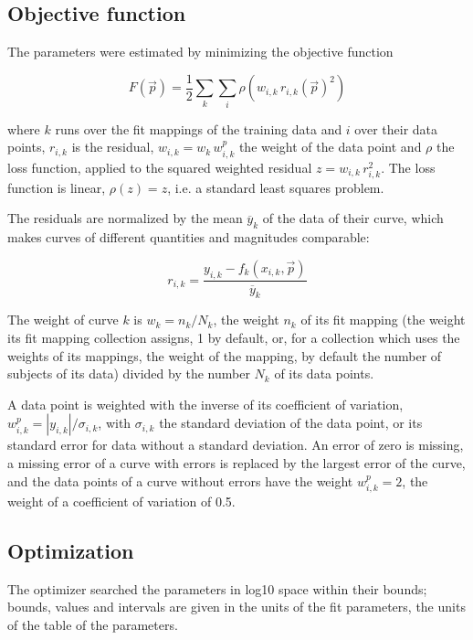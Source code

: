 \documentclass{article}
\begin{document}
\subsection{Objective function}

The parameters were estimated by minimizing the objective function

\begin{equation}
F(\vec{p}) = \frac{1}{2} \sum_{k} \sum_{i} \rho\left(w_{i,k}\, r_{i,k}(\vec{p})^2\right)
\end{equation}

where $k$ runs over the fit mappings of the training data and $i$ over their data points, $r_{i,k}$ is the residual, $w_{i,k} = w_k\, w^{p}_{i,k}$ the weight of the data point and $\rho$ the loss function, applied to the squared weighted residual $z = w_{i,k}\, r_{i,k}^2$. The loss function is linear, $\rho(z) = z$, i.e. a standard least squares problem.

The residuals are normalized by the mean $\overline{y}_k$ of the data of their curve, which makes curves of different quantities and magnitudes comparable:

\begin{equation}
r_{i,k} = \frac{y_{i,k} - f_k(x_{i,k}, \vec{p})}{\overline{y}_k}
\end{equation}

The weight of curve $k$ is $w_k = n_k / N_k$, the weight $n_k$ of its fit mapping (the weight its fit mapping collection assigns, 1 by default, or, for a collection which uses the weights of its mappings, the weight of the mapping, by default the number of subjects of its data) divided by the number $N_k$ of its data points.

A data point is weighted with the inverse of its coefficient of variation, $w^{p}_{i,k} = |y_{i,k}| / \sigma_{i,k}$, with $\sigma_{i,k}$ the standard deviation of the data point, or its standard error for data without a standard deviation. An error of zero is missing, a missing error of a curve with errors is replaced by the largest error of the curve, and the data points of a curve without errors have the weight $w^{p}_{i,k} = 2$, the weight of a coefficient of variation of 0.5.

\subsection{Optimization}

The optimizer searched the parameters in log10 space within their bounds; bounds, values and intervals are given in the units of the fit parameters, the units of the table of the parameters.
\end{document}
